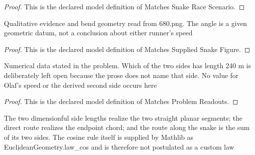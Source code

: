 \begin{proof}
  This is the declared model definition of Matches Snake Race Scenario.
\end{proof}
\begin{definition}
  \label{def:physics:phyx-mini-0680:phyxminiproblems-problemphyxmini0680-matchessuppliedsnakefigure}
  Qualitative evidence and bend geometry read from 680.png. The angle is a given geometric datum, not a conclusion about either runner's speed
\end{definition}
\begin{proof}
  This is the declared model definition of Matches Supplied Snake Figure.
\end{proof}
\begin{definition}
  \label{def:physics:phyx-mini-0680:phyxminiproblems-problemphyxmini0680-matchesproblemreadouts}
  Numerical data stated in the problem. Which of the two sides has length 240 m is deliberately left open because the prose does not name that side. No value for Olaf's speed or the derived second side occurs here
\end{definition}
\begin{proof}
  This is the declared model definition of Matches Problem Readouts.
\end{proof}
\begin{definition}
  \label{def:physics:phyx-mini-0680:phyxminiproblems-problemphyxmini0680-satisfiestwostraightsidegeometry}
  The two dimensionful side lengths realize the two straight planar segments; the direct route realizes the endpoint chord; and the route along the snake is the sum of its two sides. The cosine rule itself is supplied by Mathlib as EuclideanGeometry.law\_cos and is therefore not postulated as a custom law
\end{definition}
